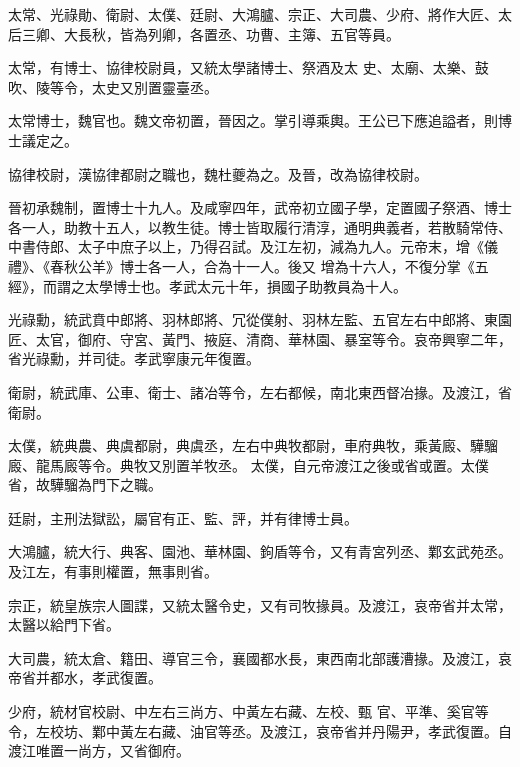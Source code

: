 \begin{pinyinscope}
 太常、光祿勛、衛尉、太僕、廷尉、大鴻臚、宗正、大司農、少府、將作大匠、太后三卿、大長秋，皆為列卿，各置丞、功曹、主簿、五官等員。



 太常，有博士、協律校尉員，又統太學諸博士、祭酒及太
 史、太廟、太樂、鼓吹、陵等令，太史又別置靈臺丞。



 太常博士，魏官也。魏文帝初置，晉因之。掌引導乘輿。王公已下應追謚者，則博士議定之。



 協律校尉，漢協律都尉之職也，魏杜夔為之。及晉，改為協律校尉。



 晉初承魏制，置博士十九人。及咸寧四年，武帝初立國子學，定置國子祭酒、博士各一人，助教十五人，以教生徒。博士皆取履行清淳，通明典義者，若散騎常侍、中書侍郎、太子中庶子以上，乃得召試。及江左初，減為九人。元帝末，增《儀禮》、《春秋公羊》博士各一人，合為十一人。後又
 增為十六人，不復分掌《五經》，而謂之太學博士也。孝武太元十年，損國子助教員為十人。



 光祿勳，統武賁中郎將、羽林郎將、冗從僕射、羽林左監、五官左右中郎將、東園匠、太官，御府、守宮、黃門、掖庭、清商、華林園、暴室等令。哀帝興寧二年，省光祿勳，并司徒。孝武寧康元年復置。



 衛尉，統武庫、公車、衛士、諸冶等令，左右都候，南北東西督冶掾。及渡江，省衛尉。



 太僕，統典農、典虞都尉，典虞丞，左右中典牧都尉，車府典牧，乘黃廄、驊騮廄、龍馬廄等令。典牧又別置羊牧丞。
 太僕，自元帝渡江之後或省或置。太僕省，故驊騮為門下之職。



 廷尉，主刑法獄訟，屬官有正、監、評，并有律博士員。



 大鴻臚，統大行、典客、園池、華林園、鉤盾等令，又有青宮列丞、鄴玄武苑丞。及江左，有事則權置，無事則省。



 宗正，統皇族宗人圖諜，又統太醫令史，又有司牧掾員。及渡江，哀帝省并太常，太醫以給門下省。



 大司農，統太倉、籍田、導官三令，襄國都水長，東西南北部護漕掾。及渡江，哀帝省并都水，孝武復置。



 少府，統材官校尉、中左右三尚方、中黃左右藏、左校、甄
 官、平準、奚官等令，左校坊、鄴中黃左右藏、油官等丞。及渡江，哀帝省并丹陽尹，孝武復置。自渡江唯置一尚方，又省御府。




\end{pinyinscope}
